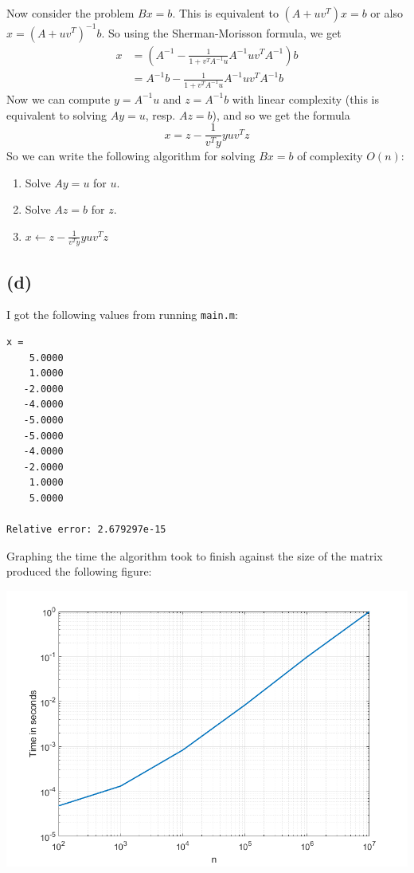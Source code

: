 \documentclass{article}
\begin{document}
Now consider the problem $Bx = b$. This is equivalent to 
$(A + uv^T)x = b$ or also $x = (A + uv^T)^{-1}b$. So using the Sherman-Morisson
formula, we get
\begin{align*}
	x &= \left(A^{-1} - \frac{1}{1 + v^TA^{-1}u}A^{-1}uv^TA^{-1}\right)b\\
	&= A^{-1}b - \frac{1}{1 + v^TA^{-1}u}A^{-1}uv^TA^{-1}b
\end{align*}
Now we can compute $y = A^{-1}u$ and $z = A^{-1}b$ with linear complexity
(this is equivalent to solving $Ay = u$, resp. $Az = b$),
and so we get the formula
\begin{equation*}
	x = z - \frac{1}{v^Ty}yuv^Tz
\end{equation*}
So we can write the following algorithm for solving $Bx = b$ of complexity
$O(n)$:
\begin{enumerate}
	\item Solve $Ay = u$ for $u$.
	\item Solve $Az = b$ for $z$.
	\item $x \leftarrow z - \frac{1}{v^Ty}yuv^Tz$

\end{enumerate}

\subsection*{(d)}

I got the following values from running {\tt main.m}:
\begin{Verbatim}[frame=single,
	label=Output of main.m]
x = 
    5.0000
    1.0000
   -2.0000
   -4.0000
   -5.0000
   -5.0000
   -4.0000
   -2.0000
    1.0000
    5.0000

Relative error: 2.679297e-15
\end{Verbatim}

Graphing the time the algorithm took to finish against the size of the matrix
produced the following figure:
\begin{center}
	\includegraphics[scale=0.6]{figure.png}
\end{center}
\end{document}
